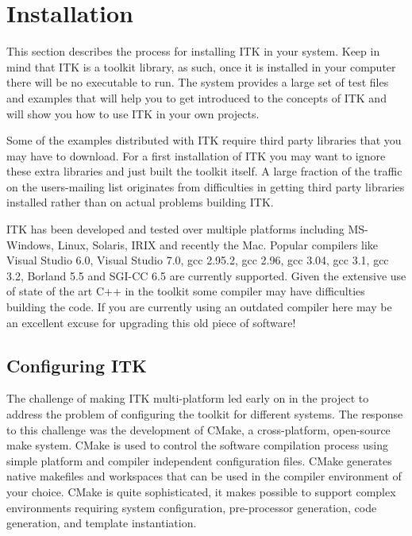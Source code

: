 \chapter{Installation}
\label{chapter:Installation}


This section describes the process for installing ITK in your system. Keep in
mind that ITK is a toolkit library, as such, once it is installed in your
computer there will be no executable to run. The system provides a large set
of test files and examples that will help you to get introduced to the
concepts of ITK and will show you how to use ITK in your own projects.

Some of the examples distributed with ITK require third party libraries that
you may have to download. For a first installation of ITK you may want to
ignore these extra libraries and just built the toolkit itself. A large
fraction of the traffic on the users-mailing list originates from
difficulties in getting third party libraries installed rather than on actual
problems building ITK.

ITK has been developed and tested over multiple platforms including
MS-Windows, Linux, Solaris, IRIX and recently the Mac. Popular compilers like
Visual Studio 6.0, Visual Studio 7.0, gcc 2.95.2, gcc 2.96, gcc 3.04, gcc
3.1, gcc 3.2, Borland 5.5 and SGI-CC 6.5 are currently supported. Given the
extensive use of state of the art C++ in the toolkit some compiler may have
difficulties building the code. If you are currently using an outdated
compiler here may be an excellent excuse for upgrading this old piece of
software!

\section{Configuring ITK}
\label{sec:ConfiguringITK}

 
The challenge of making ITK multi-platform led early on in the project to
address the problem of configuring the toolkit for different systems. The
response to this challenge was the development of CMake, a cross-platform,
open-source make system. CMake is used to control the software compilation
process using simple platform and compiler independent configuration files.
CMake generates native makefiles and workspaces that can be used in the
compiler environment of your choice. CMake is quite sophisticated, it makes
possible to support complex environments requiring system configuration,
pre-processor generation, code generation, and template instantiation.

